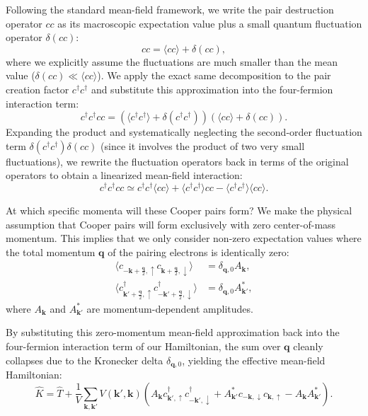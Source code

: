 Following the standard mean-field framework, we write the pair destruction operator \( cc \) as its macroscopic expectation value plus a small quantum fluctuation operator \( \delta(cc) \):
\[
    cc = \langle cc \rangle + \delta(cc),
\]
where we explicitly assume the fluctuations are much smaller than the mean value (\( \delta(cc) \ll \langle cc \rangle \)). We apply the exact same decomposition to the pair creation factor \( c^\dagger c^\dagger \) and substitute this approximation into the four-fermion interaction term:
\[
    c^\dagger c^\dagger cc = \left( \langle c^\dagger c^\dagger \rangle + \delta(c^\dagger c^\dagger) \right) \left( \langle cc \rangle + \delta(cc) \right).
\]
Expanding the product and systematically neglecting the second-order fluctuation term \( \delta(c^\dagger c^\dagger)\delta(cc) \) (since it involves the product of two very small fluctuations), we rewrite the fluctuation operators back in terms of the original operators to obtain a linearized mean-field interaction:
\[
    c^\dagger c^\dagger cc \simeq c^\dagger c^\dagger \langle cc \rangle + \langle c^\dagger c^\dagger \rangle cc - \langle c^\dagger c^\dagger \rangle \langle cc \rangle.
\]

At which specific momenta will these Cooper pairs form? We make the physical assumption that Cooper pairs will form exclusively with zero center-of-mass momentum. This implies that we only consider non-zero expectation values where the total momentum \( \mathbf{q} \) of the pairing electrons is identically zero:
\[
    \begin{aligned}
        \langle c_{-\mathbf{k}+\frac{\mathbf{q}}{2},\uparrow} c_{\mathbf{k}+\frac{\mathbf{q}}{2},\downarrow} \rangle                   & = \delta_{\mathbf{q},0} A_{\mathbf{k}},    \\
        \langle c_{\mathbf{k}'+\frac{\mathbf{q}}{2},\uparrow}^\dagger c_{-\mathbf{k}'+\frac{\mathbf{q}}{2},\downarrow}^\dagger \rangle & = \delta_{\mathbf{q},0} A_{\mathbf{k}'}^*,
    \end{aligned}
\]
where \( A_{\mathbf{k}} \) and \( A_{\mathbf{k}'}^* \) are momentum-dependent amplitudes.


By substituting this zero-momentum mean-field approximation back into the four-fermion interaction term of our Hamiltonian, the sum over \( \mathbf{q} \) cleanly collapses due to the Kronecker delta \( \delta_{\mathbf{q},0} \), yielding the effective mean-field Hamiltonian:
\[
    \hat{K} = \hat{T} + \frac{1}{V} \sum_{\mathbf{k},\mathbf{k}'} V(\mathbf{k}', \mathbf{k}) \left( A_{\mathbf{k}} c_{\mathbf{k}',\uparrow}^\dagger c_{-\mathbf{k}',\downarrow}^\dagger + A_{\mathbf{k}'}^* c_{-\mathbf{k},\downarrow} c_{\mathbf{k},\uparrow} - A_{\mathbf{k}} A_{\mathbf{k}'}^* \right).
\]

